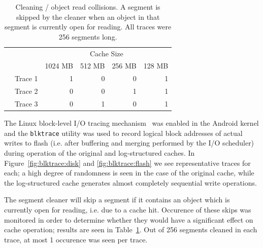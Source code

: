 \documentclass[letterpaper,twocolumn,10pt]{article}
\begin{document}
\begin{table}[t]
{\footnotesize
\begin{tabular}{llrrrr}
\cline{2-6}
 &  & \multicolumn{4}{c}{Cache Size}                                                                                     \\ \cline{2-6} 
 &        & \multicolumn{1}{l}{1024 MB} & \multicolumn{1}{l}{512 MB} & \multicolumn{1}{l}{256 MB} & \multicolumn{1}{l}{128 MB} \\
 & Trace 1      & 1                           & 0                          & 0                          & 1                          \\
 & Trace 2      & 0                           & 0                          & 1                          & 1                          \\
 & Trace 3      & 0                           & 1                          & 0                          & 1                          \\ \cline{2-6} 
\end{tabular}
}
\caption{Cleaning / object read collisions. A segment is skipped by the cleaner
  when an object in that segment is currently open for reading. All traces
  were  256 segments long.}
\label{table:collision}
\end{table}

The Linux block-level I/O tracing mechanism~\cite{axboe_blktrace} was enabled in
the Android kernel and the \texttt{blktrace} utility was used to record logical
block addresses of actual writes to flash (i.e. after buffering and merging
performed by the I/O scheduler) during operation of the original and
log-structured caches. In Figure~\ref{fig:blktrace:disk} and
\ref{fig:blktrace:flash} we see representative traces for each; a high degree of
randomness is seen in the case of the original cache, while the log-structured
cache generates almost completely sequential write operations.

The segment cleaner will skip a segment if it contains an object which is
currently open for reading, i.e. due to a cache hit. Occurence of these skips
was monitored in order to determine whether they would have a significant effect
on cache operation; results are seen in Table~\ref{table:collision}. Out of 256
segments cleaned in each trace, at most 1 occurence was seen per trace.
\end{document}
